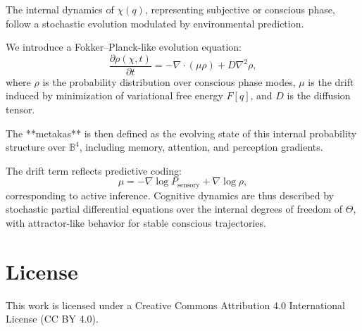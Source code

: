 \documentclass[12pt]{article}
\begin{document}
The internal dynamics of \( \chi(q) \), representing subjective or conscious phase, follow a stochastic evolution modulated by environmental prediction.

We introduce a Fokker–Planck-like evolution equation:
\[
\frac{\partial \rho(\chi, t)}{\partial t} = -\nabla \cdot \left( \mu \rho \right) + D \nabla^2 \rho,
\]
where \( \rho \) is the probability distribution over conscious phase modes, \( \mu \) is the drift induced by minimization of variational free energy \( F[q] \), and \( D \) is the diffusion tensor.

The **metakas** is then defined as the evolving state of this internal probability structure over \( \mathbb{B}^4 \), including memory, attention, and perception gradients.

The drift term reflects predictive coding:
\[
\mu = -\nabla \log P_\text{sensory} + \nabla \log \rho,
\]
corresponding to active inference. Cognitive dynamics are thus described by stochastic partial differential equations over the internal degrees of freedom of \( \Theta \), with attractor-like behavior for stable conscious trajectories.

\section*{License}
This work is licensed under a Creative Commons Attribution 4.0 International License (CC BY 4.0).
\end{document}
